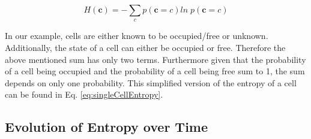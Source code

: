 \documentclass[a4paper,12pt]{article}
\begin{document}
			\begin{equation}
				H \left(\textbf{c}\right) = - \sum_{c} p\left(\textbf{c}=c\right)ln \; p\left(\textbf{c}=c\right)
				\label{eq:singleCellEntropy1}
			\end{equation}
			
			In our example, cells are either known to be occupied/free or unknown. Additionally, the state of a cell can either be occupied or free. Therefore the above mentioned sum has only two terms. Furthermore given that the probability of a cell being occupied and the probability of a cell being free sum to 1, the sum depends on only one probability. This simplified version of the entropy of a cell can be found in Eq. \ref{eq:singleCellEntropy}. 

		\subsection{Evolution of Entropy over Time}

	
	\newpage
	
	
	\newpage
	\appendix
	\appendixpage
	\addappheadtotoc
	
\end{document}
